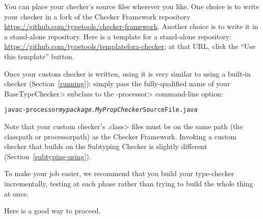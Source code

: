 
You can place your checker's source files wherever you like.
One choice is to write your checker in a fork of the Checker Framework
repository \url{https://github.com/typetools/checker-framework}.
Another choice is to write it in a stand-alone repository.  Here is a
template for a stand-alone repository:
\url{https://github.com/typetools/templatefora-checker}; at that URL,
click the ``Use this template'' button.


Once your custom checker is written, using it is very similar to using a
built-in checker (Section~\ref{running}):
simply pass the fully-qualified name of your \<BaseTypeChecker>
subclass to the \<-processor> command-line option:
\begin{alltt}
  javac -processor \textit{mypackage.MyPropChecker} SourceFile.java
\end{alltt}
Note that your custom checker's
\<.class> files must be on the same path (the classpath or processorpath)
as the Checker Framework.
Invoking a custom checker that builds on
the Subtyping Checker is slightly different (Section~\ref{subtyping-using}).




To make your job easier, we recommend that you build your type-checker
incrementally, testing at each phase rather than trying to build the whole
thing at once.

Here is a good way to proceed.

